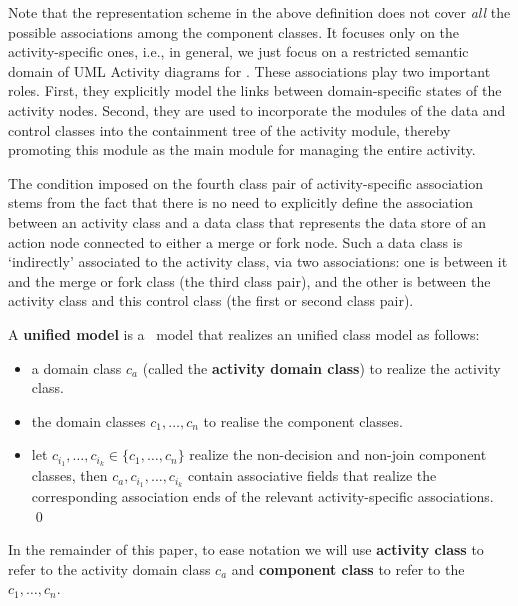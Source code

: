 Note that the representation scheme in the above definition does not cover \textit{all} the possible associations among the component classes. It focuses only on the activity-specific ones, i.e., in general, we just focus on a restricted semantic domain of UML Activity diagrams for \agl. %
%
These associations play two important roles. First, they explicitly model the links between domain-specific states of the activity nodes. Second, they are used to incorporate the modules of the data and control classes into the containment tree of the activity module, thereby promoting this module as the main module for managing the entire activity.

The condition imposed on the fourth class pair of activity-specific association stems from the fact that there is no need to explicitly define the association between an activity class and a data class that represents the data store of an action node connected to either a merge or fork node. Such a data class is `indirectly' associated to the activity class, via two associations: one is between it and the merge or fork class (the third class pair), and the other is between the activity class and this control class (the first or second class pair).

\begin{definition} \label{def:unified-model}
	A \textbf{unified model} is a \dcsl~model that realizes an unified class model as follows:
	\begin{itemize}%
		\item a domain class $ c_a $ (called the \textbf{activity domain class}) to realize the activity class.
		\item the domain classes $ c_1,\dots,c_n $ to realise the component classes.
		\item let $ c_{i_1},\dots,c_{i_k} \in \{c_1,\dots,c_n\} $ realize the non-decision and non-join component classes, then $ c_a,c_{i_1},\dots,c_{i_k} $ contain associative fields that realize the corresponding association ends of the relevant activity-specific associations. \qed
	\end{itemize}
\end{definition}

In the remainder of this paper, to ease notation we will use \textbf{activity class} to refer to the activity domain class $ c_a $ and \textbf{component class} to refer to the $ c_1,\dots,c_n $. 


